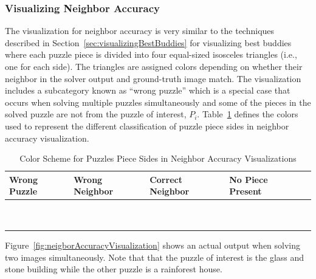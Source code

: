 \documentclass{report}
\begin{document}
\subsubsection{Visualizing Neighbor Accuracy}\label{sec:visualizingNeighborAccuracy}

The visualization for neighbor accuracy is very similar to the techniques described in Section~\ref{sec:visualizingBestBuddies} for visualizing best buddies where each puzzle piece is divided into four equal-sized isosceles triangles (i.e., one for each side).  The triangles are assigned colors depending on whether their neighbor in the solver output and ground-truth image match.  The visualization includes a subcategory known as ``wrong puzzle'' which is a special case that occurs when solving multiple puzzles simultaneously and some of the pieces in the solved puzzle are not from the puzzle of interest, $P_i$.  Table~\ref{tab:neighborAccuracyColors} defines the colors used to represent the different classification of puzzle piece sides in neighbor accuracy visualization.

\begin{table}[h]
\begin{center}
  \begin{tabular}{ | >{\centering\arraybackslash}m{0.6in} | >{\centering\arraybackslash}m{0.6in} | >{\centering\arraybackslash}m{0.6in} | >{\centering\arraybackslash}m{0.6in} | >{\centering\arraybackslash}m{0.6in} | }
 \hline
    Wrong Puzzle & Wrong Neighbor & Correct Neighbor  & No Piece Present  \\ \hline
	{\cellcolor{blue}~} & {\cellcolor{red}~} & {\cellcolor{green}~} & {\cellcolor{black}~}  \\
	{\cellcolor{blue}~} & {\cellcolor{red}~} & {\cellcolor{green}~} & {\cellcolor{black}~}  \\
 \hline
  \end{tabular}
\end{center}
\caption{Color Scheme for Puzzles Piece Sides in Neighbor Accuracy Visualizations}\label{tab:neighborAccuracyColors}
\end{table}

Figure~\ref{fig:neigborAccuracyVisualization} shows an actual output when solving two images simultaneously.  Note that that the puzzle of interest is the glass and stone building while the other puzzle is a rainforest house.
\end{document}
